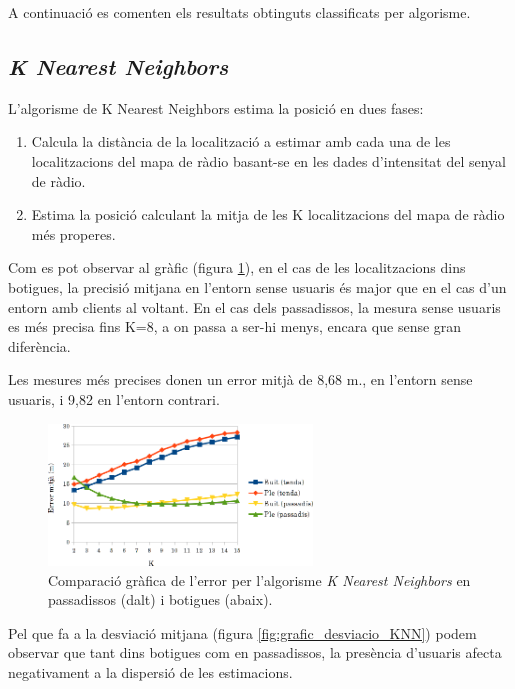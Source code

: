 A continuació es comenten els resultats obtinguts classificats per algorisme.

\subsection{\textit{K Nearest Neighbors}}

L'algorisme de K Nearest Neighbors estima la posició en dues fases:

\begin{enumerate}
    \item Calcula la distància de la localització a estimar amb cada una de les localitzacions del mapa de ràdio basant-se en les dades d'intensitat del senyal de ràdio.
    \item Estima la posició calculant la mitja de les K localitzacions del mapa de ràdio més properes.
\end{enumerate}

Com es pot observar al gràfic (figura \ref{fig:grafic_mitja_KNN}), en el cas de les localitzacions dins botigues, la precisió mitjana en l'entorn sense usuaris és major que en el cas d'un entorn amb clients al voltant. En el cas dels passadissos, la mesura sense usuaris es més precisa fins K=8, a on passa a ser-hi menys, encara que sense gran diferència.

Les mesures més precises donen un error mitjà de 8,68 m., en l'entorn sense usuaris, i 9,82 en l'entorn contrari.

\begin{figure}[ht]
\begin{center}
\includegraphics[width=7cm]{imatges/knn_mitja.png}
\caption{Comparació gràfica de l'error per l'algorisme \textit{K Nearest Neighbors} en passadissos (dalt) i botigues (abaix).}
\label{fig:grafic_mitja_KNN}
\end{center}
\end{figure}

Pel que fa a la desviació mitjana (figura \ref{fig:grafic_desviacio_KNN}) podem observar que tant dins botigues com en passadissos, la presència d'usuaris afecta negativament a la dispersió de les estimacions.

